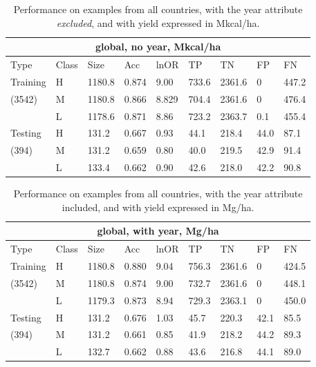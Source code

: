 \documentclass[12pt]{article}
\begin{document}
\begin{table}[h!]
\centering
\begin{tabular}{lllllllll}
\toprule
\multicolumn{9}{c}{\textbf{global, no year, Mkcal/ha}} \\
\midrule
Type & Class & Size & Acc & lnOR & TP & TN & FP & FN \\
\midrule
Training & H & 1180.8 & 0.874 & 9.00 & 733.6 & 2361.6 & 0 & 447.2  \\
(3542) & M & 1180.8 & 0.866 & 8.829 & 704.4 & 2361.6 & 0 & 476.4  \\
& L & 1178.6 & 0.871 & 8.86 & 723.2 & 2363.7 & 0.1 & 455.4  \\
Testing & H & 131.2 & 0.667 & 0.93 & 44.1 & 218.4 & 44.0 & 87.1  \\
(394) & M & 131.2 & 0.659 & 0.80 & 40.0 & 219.5 & 42.9 & 91.4  \\
& L & 133.4 & 0.662 & 0.90 & 42.6 & 218.0 & 42.2 & 90.8  \\
\bottomrule
\end{tabular}
\caption{Performance on examples from all countries, with the year attribute \emph{excluded}, and with yield expressed in Mkcal/ha.}
\label{k.ny.wt_results}
\end{table}

\begin{table}[h!]
\centering
\begin{tabular}{lllllllll}
\toprule
\multicolumn{9}{c}{\textbf{global, with year, Mg/ha}} \\
\midrule
Type & Class & Size & Acc & lnOR & TP & TN & FP & FN \\
\midrule
Training & H & 1180.8 & 0.880 & 9.04 & 756.3 & 2361.6 & 0 & 424.5  \\
(3542) & M & 1180.8 & 0.874 & 9.00 & 732.7 & 2361.6 & 0 & 448.1  \\
& L & 1179.3 & 0.873 & 8.94 & 729.3 & 2363.1 & 0 & 450.0  \\
Testing & H & 131.2 & 0.676 & 1.03 & 45.7 & 220.3 & 42.1 & 85.5  \\
(394) & M & 131.2 & 0.661 & 0.85 & 41.9 & 218.2 & 44.2 & 89.3  \\
& L & 132.7 & 0.662 & 0.88 & 43.6 & 216.8 & 44.1 & 89.0  \\
\bottomrule
\end{tabular}
\caption{Performance on examples from all countries, with the year attribute included, and with yield expressed in Mg/ha.}
\label{t.wy.wt_results}
\end{table}
\end{document}
